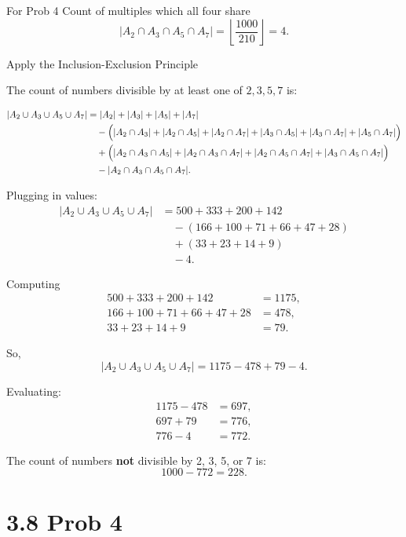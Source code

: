 \documentclass{report}
\begin{document}
\begin{RemarkWithLily}{For Prob 4}
  Count of multiples which all four share 
  \[
  |A_2 \cap A_3 \cap A_5 \cap A_7| = \left\lfloor \frac{1000}{210} \right\rfloor = 4.
  \]
  
  Apply the Inclusion-Exclusion Principle
  
  The count of numbers divisible by at least one of \(2,3,5,7\) is:
  
  \[
  \begin{aligned}
  |A_2 \cup A_3 \cup A_5 \cup A_7| &= |A_2|+|A_3|+|A_5|+|A_7| \\
  &\quad - \Bigl(|A_2 \cap A_3| + |A_2 \cap A_5| + |A_2 \cap A_7| + |A_3 \cap A_5| + |A_3 \cap A_7| + |A_5 \cap A_7|\Bigr)\\
  &\quad + \Bigl(|A_2 \cap A_3 \cap A_5| + |A_2 \cap A_3 \cap A_7| + |A_2 \cap A_5 \cap A_7| + |A_3 \cap A_5 \cap A_7|\Bigr)\\
  &\quad - |A_2 \cap A_3 \cap A_5 \cap A_7|.
  \end{aligned}
  \]
  
  Plugging in values:
  \[
  \begin{aligned}
  |A_2 \cup A_3 \cup A_5 \cup A_7| &= 500 + 333 + 200 + 142 \\
  &\quad - (166 + 100 + 71 + 66 + 47 + 28) \\
  &\quad + (33 + 23 + 14 + 9) \\
  &\quad - 4.
  \end{aligned}
  \]
  
  Computing 
  \[
  \begin{aligned}
  500+333+200+142 &= 1175, \\
  166+100+71+66+47+28 &= 478, \\
  33+23+14+9 &= 79.
  \end{aligned}
  \]
  
  So,
  \[
  |A_2 \cup A_3 \cup A_5 \cup A_7| = 1175 - 478 + 79 - 4.
  \]
  
  Evaluating:
  \[
  \begin{aligned}
  1175 - 478 &= 697, \\
  697 + 79 &= 776, \\
  776 - 4 &= 772.
  \end{aligned}
  \]
  
  The count of numbers \textbf{not} divisible by 2, 3, 5, or 7 is:
  \[
  1000 - 772 = 228.
  \]

\end{RemarkWithLily}

\section*{3.8 Prob 4}
\end{document}
